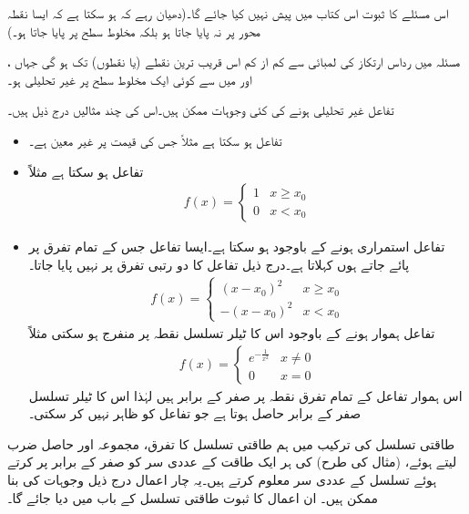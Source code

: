 اس مسئلے کا ثبوت اس کتاب میں پیش نہیں کیا جائے گا۔(دھیان رہے کہ ہو سکتا ہے کہ ایسا نقطہ  محور پر نہ پایا جاتا ہو بلکہ مخلوط سطح پر پایا جاتا ہو۔)

مسئلہ  میں  رداس ارتکاز  کی لمبائی  سے کم از کم اس قریب ترین نقطے (یا نقطوں) تک ہو گی جہاں  ،  اور   میں سے کوئی ایک مخلوط سطح پر غیر تحلیلی ہو۔

تفاعل غیر تحلیلی ہونے کی کئی وجوہات ممکن ہیں۔اس کی چند مثالیں درج ذیل ہیں۔
\begin{itemize}
\item
تفاعل  ہو سکتا ہے مثلاً  جس کی قیمت  پر غیر معین ہے۔
\item
تفاعل  ہو سکتا ہے مثلاً 
\begin{align*}
f(x)=
\begin{cases}
1&x\ge x_0\\
0& x<x_0
\end{cases}
\end{align*}
%
\item
تفاعل استمراری ہونے کے باوجود  ہو سکتا ہے۔ایسا تفاعل جس کے تمام تفرق  پر پائے جاتے ہوں  کہلاتا ہے۔درج ذیل تفاعل کا دو رتبی تفرق  پر نہیں پایا جاتا۔
\begin{align*}
f(x)=
\begin{cases}
(x-x_0)^2&x\ge x_0\\
-(x-x_0)^2& x<x_0
\end{cases}
\end{align*}
%
تفاعل ہموار ہونے کے باوجود اس کا ٹیلر تسلسل نقطہ  پر منفرج  ہو سکتی مثلاً
\begin{align*}
f(x)=
\begin{cases}
e^{-\frac{1}{x^2}}&x\ne 0\\
0& x=0
\end{cases}
\end{align*}
اس ہموار تفاعل کے تمام تفرق نقطہ  پر صفر کے برابر ہیں لہٰذا  اس کا ٹیلر تسلسل صفر کے برابر حاصل ہوتا ہے جو تفاعل کو ظاہر نہیں کر سکتی۔ 
%
\end{itemize}

طاقتی تسلسل کی ترکیب میں ہم طاقتی تسلسل کا تفرق، مجموعہ اور  حاصل ضرب لیتے ہوئے، (مثال  کی طرح)  کی ہر ایک طاقت کے عددی سر کو صفر کے برابر پر کرتے ہوئے تسلسل  کے عددی سر معلوم کرتے ہیں۔یہ چار اعمال درج ذیل وجوہات کی بنا ممکن ہیں۔ ان اعمال کا ثبوت طاقتی تسلسل کے باب میں دیا جائے گا۔

